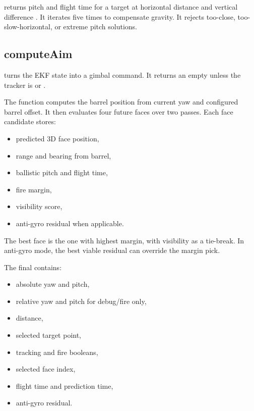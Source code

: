  returns pitch and flight time for a target at horizontal
distance  and vertical difference . It iterates five times
to compensate gravity. It rejects too-close, too-slow-horizontal, or extreme
pitch solutions.

\subsection{computeAim}

 turns the EKF state into a gimbal command. It returns an
empty  unless the tracker is  or
.

The function computes the barrel position from current yaw and configured
barrel offset. It then evaluates four future faces over two passes. Each face
candidate stores:

\begin{itemize}
  \item predicted 3D face position,
  \item range and bearing from barrel,
  \item ballistic pitch and flight time,
  \item fire margin,
  \item visibility score,
  \item anti-gyro residual when applicable.
\end{itemize}

The best face is the one with highest margin, with visibility as a tie-break.
In anti-gyro mode, the best viable residual can override the margin pick.

The final  contains:

\begin{itemize}
  \item absolute yaw and pitch,
  \item relative yaw and pitch for debug/fire only,
  \item distance,
  \item selected target point,
  \item tracking and fire booleans,
  \item selected face index,
  \item flight time and prediction time,
  \item anti-gyro residual.
\end{itemize}

\section{}

